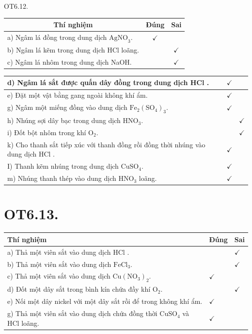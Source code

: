 \documentclass[10pt]{article}
\begin{document}
OT6.12.

\begin{center}
\begin{tabular}{|l|c|c|}
\hline
\multicolumn{1}{|c|}{Thí nghiệm} & Đúng & Sai \\
\hline
a) Ngâm lá đồng trong dung dịch $\mathrm{AgNO}_{3}$. & $\checkmark$ &  \\
\hline
b) Ngâm lá kẽm trong dung dịch HCl loãng. &  & $\checkmark$ \\
\hline
c) Ngâm lá nhôm trong dung dịch NaOH. &  & $\checkmark$ \\
\hline
\end{tabular}
\end{center}

\begin{center}
\begin{tabular}{|l|l|l|}
\hline
d) Ngâm lá sắt được quấn dây đồng trong dung dịch HCl . & $\checkmark$ &  \\
\hline
e) Đặt một vật bằng gang ngoài không khí ẩm. & $\checkmark$ &  \\
\hline
g) Ngâm một miếng đồng vào dung dịch $\mathrm{Fe}_{2}\left(\mathrm{SO}_{4}\right)_{3}$. & $\checkmark$ &  \\
\hline
h) Nhúng sợi dây bạc trong dung dịch $\mathrm{HNO}_{3}$. &  & $\checkmark$ \\
\hline
i) Đốt bột nhôm trong khí $\mathrm{O}_{2}$. &  & $\checkmark$ \\
\hline
k) Cho thanh sắt tiếp xúc với thanh đồng rồi đồng thời nhúng vào dung dịch HCl . & $\checkmark$ &  \\
\hline
I) Thanh kẽm nhúng trong dung dịch $\mathrm{CuSO}_{4}$. & $\checkmark$ &  \\
\hline
m) Nhúng thanh thép vào dung dịch $\mathrm{HNO}_{3}$ loãng. & $\checkmark$ &  \\
\hline
\end{tabular}
\end{center}

\section*{OT6.13.}
\begin{center}
\begin{tabular}{|l|l|l|}
\hline
Thí nghiệm & Đúng & Sai \\
\hline
a) Thả một viên sắt vào dung dịch HCl . &  & $\checkmark$ \\
\hline
b) Thả một viên sắt vào dung dịch $\mathrm{FeCl}_{3}$. &  & $\checkmark$ \\
\hline
c) Thả một viên sắt vào dung dịch $\mathrm{Cu}\left(\mathrm{NO}_{3}\right)_{2}$. & $\checkmark$ &  \\
\hline
d) Đốt một dây sắt trong bình kín chứa đầy khí $\mathrm{O}_{2}$. &  & $\checkmark$ \\
\hline
e) Nối một dây nickel với một dây sắt rồi để trong không khí ẩm. & $\checkmark$ &  \\
\hline
g) Thả một viên sắt vào dung dịch chứa đồng thời $\mathrm{CuSO}_{4}$ và HCl loãng. & $\checkmark$ &  \\
\hline
\end{tabular}
\end{center}
\end{document}
